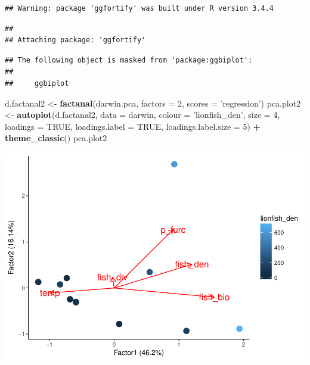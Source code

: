 \documentclass[]{article}
\newenvironment{Shaded}{\begin{snugshade}}{\end{snugshade}}
\newcommand{\KeywordTok}[1]{\textcolor[rgb]{0.13,0.29,0.53}{\textbf{#1}}}
\newcommand{\DataTypeTok}[1]{\textcolor[rgb]{0.13,0.29,0.53}{#1}}
\newcommand{\DecValTok}[1]{\textcolor[rgb]{0.00,0.00,0.81}{#1}}
\newcommand{\StringTok}[1]{\textcolor[rgb]{0.31,0.60,0.02}{#1}}
\newcommand{\OtherTok}[1]{\textcolor[rgb]{0.56,0.35,0.01}{#1}}
\newcommand{\OperatorTok}[1]{\textcolor[rgb]{0.81,0.36,0.00}{\textbf{#1}}}
\newcommand{\NormalTok}[1]{#1}
\begin{document}
\begin{verbatim}
## Warning: package 'ggfortify' was built under R version 3.4.4
\end{verbatim}

\begin{verbatim}
## 
## Attaching package: 'ggfortify'
\end{verbatim}

\begin{verbatim}
## The following object is masked from 'package:ggbiplot':
## 
##     ggbiplot
\end{verbatim}

\begin{Shaded}
\begin{Highlighting}[]
\NormalTok{d.factanal2 <-}\StringTok{ }\KeywordTok{factanal}\NormalTok{(darwin.pca, }\DataTypeTok{factors =} \DecValTok{2}\NormalTok{, }\DataTypeTok{scores =} \StringTok{'regression'}\NormalTok{)}
\NormalTok{pca.plot2 <-}\StringTok{ }\KeywordTok{autoplot}\NormalTok{(d.factanal2, }\DataTypeTok{data =}\NormalTok{ darwin, }\DataTypeTok{colour =} \StringTok{'lionfish_den'}\NormalTok{, }\DataTypeTok{size =} \DecValTok{4}\NormalTok{,}
         \DataTypeTok{loadings =} \OtherTok{TRUE}\NormalTok{, }\DataTypeTok{loadings.label =} \OtherTok{TRUE}\NormalTok{, }\DataTypeTok{loadings.label.size  =} \DecValTok{5}\NormalTok{) }\OperatorTok{+}\StringTok{ }\KeywordTok{theme_classic}\NormalTok{()}
\NormalTok{pca.plot2}
\end{Highlighting}
\end{Shaded}

\includegraphics{darwin_GLM_final_files/figure-latex/unnamed-chunk-7-1.pdf}
\end{document}
